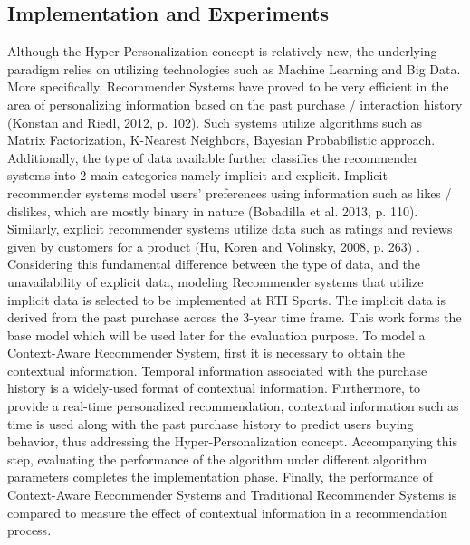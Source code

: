 \subsection{Implementation and Experiments}
Although the Hyper-Personalization concept is relatively new, the underlying paradigm relies on utilizing technologies such as Machine Learning and Big Data. More specifically, Recommender Systems have proved to be very efficient in the area of personalizing information based on the past purchase / interaction history (Konstan and Riedl, 2012, p. 102). Such systems utilize algorithms such as Matrix Factorization, K-Nearest Neighbors, Bayesian Probabilistic approach. Additionally, the type of data available further classifies the recommender systems into 2 main categories namely implicit and explicit. Implicit recommender systems model users’ preferences using information such as likes / dislikes, which are mostly binary in nature (Bobadilla et al. 2013, p. 110). Similarly, explicit recommender systems utilize data such as ratings and reviews given by customers for a product (Hu, Koren and Volinsky, 2008, p. 263) .
Considering this fundamental difference between the type of data, and the unavailability of explicit data, modeling Recommender systems that utilize implicit data is selected to be implemented at RTI Sports. The implicit data is derived from the past purchase across the 3-year time frame.  This work forms the base model which will be used later for the evaluation purpose. 
To model a Context-Aware Recommender System, first it is necessary to obtain the contextual information. Temporal information associated with the purchase history is a widely-used format of contextual information. Furthermore, to provide a real-time personalized recommendation, contextual information such as time is used along with the past purchase history to predict users buying behavior, thus addressing the Hyper-Personalization concept. Accompanying this step, evaluating the performance of the algorithm under different algorithm parameters completes the implementation phase. Finally, the performance of Context-Aware Recommender Systems and Traditional Recommender Systems is compared to measure the effect of contextual information in a recommendation process.

